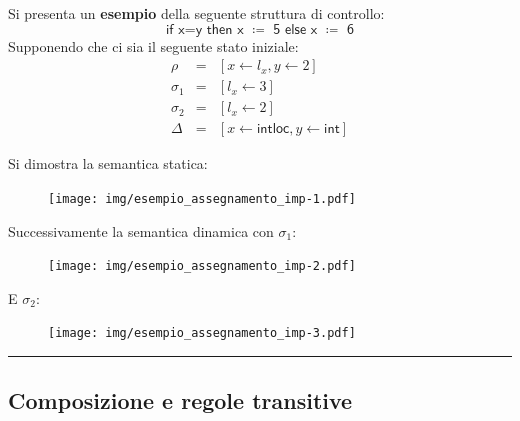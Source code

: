\documentclass[a4paper]{article}
\newcommand{\longline}{\noindent\rule{\textwidth}{0.4pt}}
\begin{document}
 	\noindent
 	Si presenta un \textcolor{Green4}{\textbf{esempio}} della seguente struttura di controllo:
 	\begin{equation*}
 		\textsf{if x=y then x $\coloneq$ 5 else x $\coloneq$ 6}
 	\end{equation*}
 	Supponendo che ci sia il seguente stato iniziale:
 	\begin{equation*}
 		\begin{array}{lll}
 			\rho 		& = & \left[x \leftarrow l_{x}, y \leftarrow 2\right] \\
 			\sigma_{1}	& = & \left[l_{x} \leftarrow 3\right] \\
 			\sigma_{2}	& = & \left[l_{x} \leftarrow 2\right] \\
 			\Delta		& = & \left[x \leftarrow \mathsf{intloc}, y \leftarrow \mathsf{int}\right]
 		\end{array}
 	\end{equation*}
 	
 	\noindent
 	Si dimostra la semantica statica:
 	\begin{figure}[!htp]
 		\centering
 		\texttt{[image: img/esempio\_assegnamento\_imp-1.pdf]}
 	\end{figure}
 	
 	\noindent
 	Successivamente la semantica dinamica con $\sigma_{1}$:
 	\begin{figure}[!htp]
 		\centering
 		\texttt{[image: img/esempio\_assegnamento\_imp-2.pdf]}
 	\end{figure}\newpage
 	
 	\noindent
 	E $\sigma_{2}$:
 	\begin{figure}[!htp]
 		\centering
 		\texttt{[image: img/esempio\_assegnamento\_imp-3.pdf]}
 	\end{figure}
 	
 	\longline
 	
 	\subsection{Composizione e regole transitive}
 	
\end{document}
